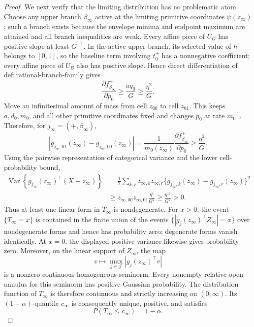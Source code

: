 \documentclass{article}
\begin{document}
\begin{proof}
We next verify that the limiting distribution has no problematic atom.  Choose any upper branch \(\beta_\infty\) active at the limiting primitive coordinates \(\psi(z_\infty)\); such a branch exists because the envelope minima and endpoint maximum are attained and all branch inequalities are weak.  Every affine piece of \(U_G\) has positive slope at least \(G^{-1}\).  In the active upper branch, its selected value of \(h\) belongs to \([0,1]\), so the baseline term involving \(t_0^+\) has a nonnegative coefficient; every affine piece of \(U_B\) also has positive slope.  Hence direct differentiation of \(\mathrm{def{:}rational\text{-}branch\text{-}family}\) gives
\[
 \frac{\partial f_{\beta_\infty}^+}{\partial p_0}
 \geq \frac{a q_0}{G}
 \geq\frac{\eta^2}{G}.
\]
Move an infinitesimal amount of mass from cell \(z_{00}\) to cell \(z_{01}\).  This keeps \(a,d_0,m_0\), and all other primitive coordinates fixed and changes \(p_0\) at rate \(m_0^{-1}\).  Therefore, for \(j_\infty=(+,\beta_\infty)\),
\[
 \left|g_{j_\infty,01}(z_\infty)-g_{j_\infty,00}(z_\infty)\right|
 =\frac1{m_0(z_\infty)}
 \frac{\partial f_{\beta_\infty}^+}{\partial p_0}
 \geq\frac{\eta^2}{G}.
\]
Using the pairwise representation of categorical variance and the lower cell-probability bound,
\[
 \begin{aligned}
 \operatorname{Var}\!\left\{
 g_{j_\infty}(z_\infty)^\top(X-z_\infty)
 \right\}
 &=\frac12\sum_{k,r}z_{\infty,k}z_{\infty,r}
 \{g_{j_\infty,k}(z_\infty)-g_{j_\infty,r}(z_\infty)\}^2\\
 &\geq z_{\infty,00}z_{\infty,01}\frac{\eta^4}{G^2}
 \geq\frac{\eta^{12}}{G^2}>0.
 \end{aligned}
\]
Thus at least one linear form in \(T_\infty\) is nondegenerate.  For \(x>0\), the event \(\{T_\infty=x\}\) is contained in the finite union of the events \(\{|g_j(z_\infty)^\top Z_\infty|=x\}\) over nondegenerate forms and hence has probability zero; degenerate forms vanish identically.  At \(x=0\), the displayed positive variance likewise gives probability zero.  Moreover, on the linear support of \(Z_\infty\), the map
\[
 v\longmapsto\max_{j\in\mathcal J}|g_j(z_\infty)^\top v|
\]
is a nonzero continuous homogeneous seminorm.  Every nonempty relative open annulus for this seminorm has positive Gaussian probability.  The distribution function of \(T_\infty\) is therefore continuous and strictly increasing on \((0,\infty)\).  Its \((1-\alpha)\)-quantile \(c_\infty\) is consequently unique, positive, and satisfies
\[
 P(T_\infty\leq c_\infty)=1-\alpha.
\]


\end{proof}
\end{document}

